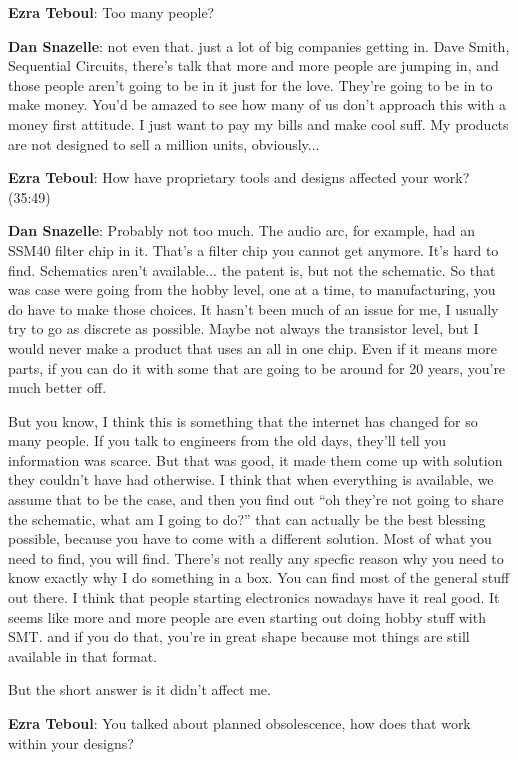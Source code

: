 \textbf{Ezra Teboul}: Too many people? 

\textbf{Dan Snazelle}: not even that. just a lot of big companies getting in. Dave Smith, Sequential Circuits, there's talk that more and more people are jumping in, and those people aren't going to be in it just for the love. They're going to be in to make money. You'd be amazed to see how many of us don't approach this with a money first attitude. I just want to pay my bills and make cool suff. My products are not designed to sell a million units, obviously... 

\textbf{Ezra Teboul}: How have proprietary tools and designs affected your work? (35:49)

\textbf{Dan Snazelle}: Probably not too much. The audio arc, for example, had an SSM40 filter chip in it. That's a filter chip you cannot get anymore. It's hard to find. Schematics aren't available... the patent is, but not the schematic. So that was case were going from the hobby level, one at a time, to manufacturing, you do have to make those choices. It hasn't been much of an issue for me, I usually try to go as discrete as possible. Maybe not always the transistor level, but I would never make a product that uses an all in one chip. Even if it means more parts, if you can do it with some that are going to be around for 20 years, you're much better off. 

But you know, I think this is something that the internet has changed for so many people. If you talk to engineers from the old days, they'll tell you information was scarce. But that was good, it made them come up with solution they couldn't have had otherwise. I think that when everything is available, we assume that to be the case, and then you find out ``oh they're not going to share the schematic, what am I going to do?'' that can actually be the best blessing possible, because you have to come with a different solution. Most of what you need to find, you will find. There's not really any specfic reason why you need to know exactly why I do something in a box. You can find most of the general stuff out there. I think that people starting electronics nowadays have it real good. It seems like more and more people are even starting out doing hobby stuff with SMT. and if you do that, you're in great shape because mot things are still available in that format. 

But the short answer is it didn't affect me. 

\textbf{Ezra Teboul}: You talked about planned obsolescence, how does that work within your designs? 

